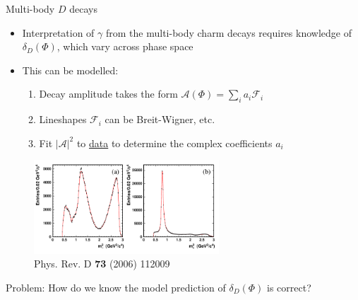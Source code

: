 \documentclass[dvipsnames]{beamer}
\begin{document}
\begin{frame}{Multi-body $D$ decays}
  \begin{itemize}
    \setlength\itemsep{0.5em}
    \item{Interpretation of $\gamma$ from the multi-body charm decays requires knowledge of $\delta_D(\Phi)$, which vary across phase space}
    \item{This can be modelled:}
    \begin{enumerate}
      \item{Decay amplitude takes the form $\mathcal{A}(\Phi) = \sum_ia_i\mathcal{F}_i$}
      \item{Lineshapes $\mathcal{F}_i$ can be Breit-Wigner, etc.}
      \item{Fit $\lvert\mathcal{A}\rvert^2$ to \underline{data} to determine the complex coefficients $a_i$}
    \end{enumerate}
  \end{itemize}
  \begin{figure}
    \centering
    \includegraphics[height = 3.5cm]{Plots/ds2dpi1.pdf}
    \vspace{-0.4cm}
    \caption*{\tiny Phys. Rev. D \textbf{73} (2006) 112009}
  \end{figure}
  \vspace{-0.6cm}
  \begin{center}
    Problem: How do we know the model prediction of $\delta_D(\Phi)$ is correct?
  \end{center}
\end{frame}
\end{document}
